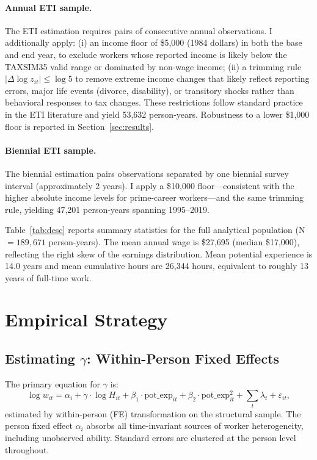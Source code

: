 \documentclass[12pt]{article}
\theoremstyle{definition}
\theoremstyle{remark}
\begin{document}
\paragraph{Annual ETI sample.} The ETI estimation requires pairs of consecutive annual
observations. I additionally apply: (i) an income floor of \$5,000 (1984 dollars) in both
the base and end year, to exclude workers whose reported income is likely below the TAXSIM35
valid range or dominated by non-wage income; (ii) a trimming rule $|\Delta \log z_{it}| \leq
\log 5$ to remove extreme income changes that likely reflect reporting errors, major
life events (divorce, disability), or transitory shocks rather than behavioral responses to
tax changes. These restrictions follow standard practice in the ETI literature \citep{gruber2002elasticity,
saez2012elasticity} and yield 53,632 person-years. Robustness to a lower \$1,000 floor is
reported in Section~\ref{sec:results}.

\paragraph{Biennial ETI sample.} The biennial estimation pairs observations separated by one
biennial survey interval (approximately 2 years). I apply a \$10,000 floor---consistent with
the higher absolute income levels for prime-career workers---and the same trimming rule,
yielding 47,201 person-years spanning 1995--2019.

Table~\ref{tab:desc} reports summary statistics for the full analytical population
(N $= 189{,}671$ person-years). The mean annual wage is \$27,695 (median \$17,000), reflecting
the right skew of the earnings distribution. Mean potential experience is 14.0 years and
mean cumulative hours are 26,344 hours, equivalent to roughly 13 years of full-time work.

\section{Empirical Strategy}
\label{sec:empirics}

\subsection{Estimating $\gamma$: Within-Person Fixed Effects}

The primary equation for $\gamma$ is:
\begin{equation}
\label{eq:fe_main}
\log w_{it} = \alpha_i + \gamma \cdot \log H_{it} + \beta_1 \cdot \text{pot\_exp}_{it}
+ \beta_2 \cdot \text{pot\_exp}_{it}^2 + \sum_t \lambda_t + \varepsilon_{it},
\end{equation}
estimated by within-person (FE) transformation on the structural sample. The person fixed
effect $\alpha_i$ absorbs all time-invariant sources of worker heterogeneity, including
unobserved ability. Standard errors are clustered at the person level throughout.
\end{document}
